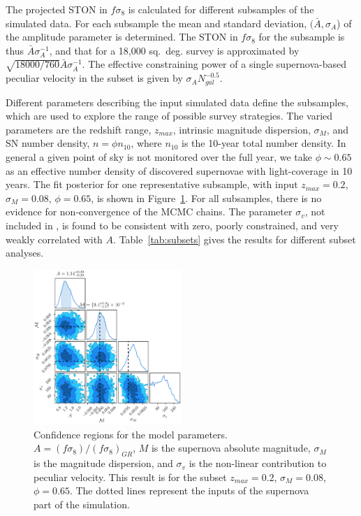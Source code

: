 \documentclass{aastex62}   	%
\begin{document}
The projected STON in $f\sigma_8$ is calculated for different subsamples of the simulated data.
For each subsample  the mean  and standard deviation, $(\bar{A}, \sigma_A$) of the amplitude parameter is
determined.  The STON in $f\sigma_8$ for the subsample is thus  $\bar{A} \sigma^{-1}_A$, and that for a 18,000 sq.~deg. survey  is approximated by
$\sqrt{18000/760}\bar{A}\sigma^{-1}_A$.  The effective constraining power of a single supernova-based peculiar velocity in the subset is given by 
 $\sigma_A N_{gal}^{-0.5}$.

Different parameters describing the input simulated data define the subsamples, 
which are used to explore the range of possible survey strategies.   The varied parameters are the redshift range, $z_{max}$, intrinsic
magnitude dispersion, $\sigma_M$, and SN number density, $n = \phi n_{10}$, where $ n_{10}$ is the  10-year total number density.  In general a given point
of sky is not monitored over the full year, we take
$\phi \sim 0.65$ as an effective number density of discovered supernovae with light-coverage in 10 years.  
The fit posterior for one representative subsample, with input  $z_{max}=0.2$, $\sigma_M=0.08$, $\phi=0.65$, is shown in Figure~\ref{zmax:fig}.
For all subsamples, there is no evidence for non-convergence of the MCMC chains.  The parameter $\sigma_v$, not included in  \citet{2015JCAP...12..033H, 2017JCAP...05..015H},
is found to be consistent with zero, poorly constrained, and very weakly correlated with $A$.  Table~\ref{tab:subsets} gives the results for different subset analyses.

\begin{figure}
\centering
\includegraphics[width=0.5\textwidth]{../outcosmo/pvlist.0.08.1234.0.65.0.2.pkl.png}
\caption{Confidence regions for the model parameters.  $A=(f\sigma_8)/(f\sigma_8)_{GR}$, $M$ is the supernova
absolute magnitude, $\sigma_M$ is the magnitude dispersion, and $\sigma_v$ is the non-linear contribution
to peculiar velocity.  This result is for the subset $z_{max}=0.2$, $\sigma_M=0.08$, $\phi=0.65$.  The dotted lines represent the inputs of the supernova
part of the simulation.
\label{zmax:fig}}
\end{figure}
\end{document}
